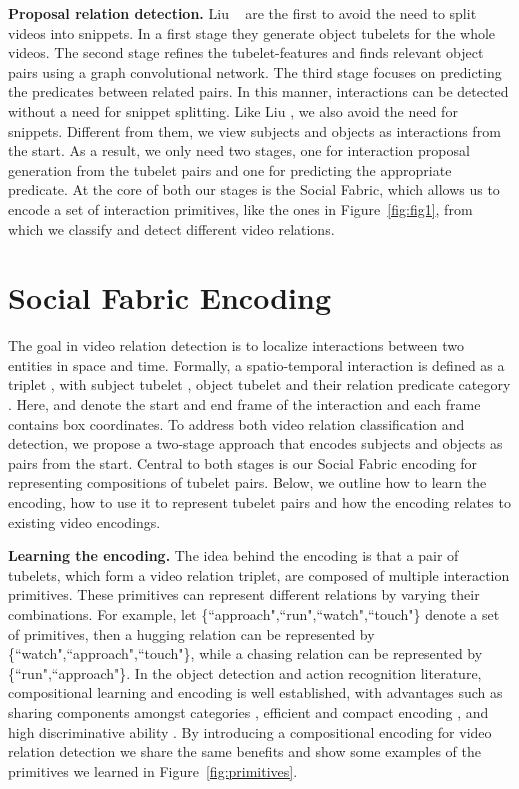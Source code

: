 \documentclass[10pt,twocolumn,letterpaper]{article}
\begin{document}
\textbf{Proposal relation detection.}
Liu \etal~\cite{liu2020beyond} are the first to avoid the need to split videos into snippets. In a first stage they generate object tubelets for the whole videos. The second stage refines the tubelet-features and finds relevant object pairs using a graph convolutional network. The third stage focuses on predicting the predicates between related pairs. In this manner, interactions can be detected without a need for snippet splitting. Like Liu \etal, we also avoid the need for snippets.
Different from them, we view subjects and objects as interactions from the start. As a result, we only need two stages, one for interaction proposal generation from the tubelet pairs and one for predicting the appropriate predicate. At the core of both our stages is the Social Fabric, which allows us to encode a set of interaction primitives, like the ones in Figure~\ref{fig:fig1}, from which we classify and detect different video relations. 

\section{Social Fabric Encoding}
The goal in video relation detection is to localize interactions between two entities in space and time. Formally, a spatio-temporal interaction  is defined as a triplet , with subject tubelet , object tubelet  and their relation predicate category . Here,  and  denote the start and end frame of the interaction and each frame contains box coordinates. To address both video relation classification and detection, we propose a two-stage approach that encodes subjects and objects as pairs from the start. Central to both stages is our Social Fabric encoding for representing compositions of tubelet pairs. Below, we outline how to learn the encoding, how to use it to represent tubelet pairs and how the encoding relates to existing video encodings.

\textbf{Learning the encoding.}
The idea behind the encoding is that a pair of tubelets, which form a video relation triplet, are composed of multiple interaction primitives. These primitives can represent different relations by varying their combinations. For example, let \{``approach",``run",``watch",``touch"\} denote a set of primitives, then a hugging relation can be represented by \{``watch",``approach",``touch"\}, while a chasing relation can be represented by \{``run",``approach"\}. In the object detection and action recognition literature, compositional learning and encoding is well established, with advantages such as sharing components amongst categories \eg \cite{gaidon2013temporal}, efficient and compact encoding \eg \cite{yuille2011towards}, and high discriminative ability \eg \cite{juneja2013blocks, kortylewski2020compositional}. By introducing a compositional encoding for video relation detection we share the same benefits and show some examples of the primitives we learned in Figure~\ref{fig:primitives}.
\end{document}
